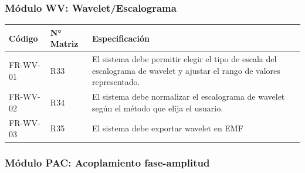 \documentclass[12pt, letterpaper]{article}
\begin{document}
\subsubsection{Módulo WV: Wavelet/Escalograma}

\begin{longtable}{|p{2.5cm}|p{2.5cm}|p{10.1cm}|}
\hline
\rowcolor{gray!25}
\textbf{Código} & \textbf{N° Matriz} & \textbf{Especificación} \\
\hline
\endhead

\hline
\endlastfoot

FR-WV-01 & R33 & El sistema debe permitir elegir el tipo de escala del escalograma de wavelet y ajustar el rango de valores representado. \\
\hline
FR-WV-02 & R34 & El sistema debe normalizar el escalograma de wavelet según el método que elija el usuario. \\
\hline
FR-WV-03 & R35 & El sistema debe exportar wavelet en EMF \\

\end{longtable}
\vspace{-0.5em}
\label{tab:fr-wv}

\subsubsection{Módulo PAC: Acoplamiento fase-amplitud}
\end{document}
